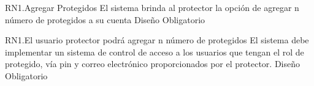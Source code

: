 	
\begin{BussinesRule}{RN1.}{Agregar Protegidos}
	\BRitem[Descripción:] El sistema brinda al protector  la opción de  agregar n número de protegidos a su cuenta
	\BRitem[Tipo:] Diseño
	\BRitem[Nivel:] Obligatorio
\end{BussinesRule}


\begin{BussinesRule}{RN1.}{El usuario protector podrá agregar n número de protegidos}
	\BRitem[Descripción:] El sistema debe implementar un sistema de control de acceso a los usuarios que tengan el rol de protegido, vía pin y correo electrónico  proporcionados por el protector.
	\BRitem[Tipo:] Diseño
	\BRitem[Nivel:] Obligatorio
\end{BussinesRule}



